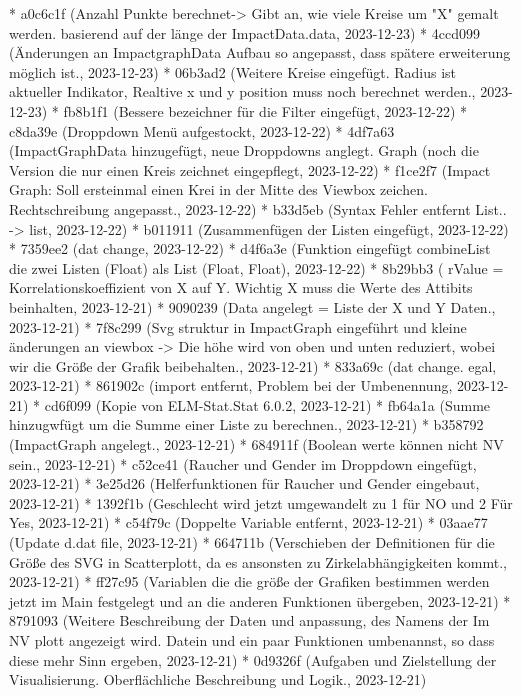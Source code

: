 \documentclass[usegeometry=true]{scrartcl}
\begin{document}
* a0c6c1f (Anzahl Punkte berechnet-> Gibt an, wie viele Kreise um "X" gemalt werden. basierend auf der länge der ImpactData.data, 2023-12-23)
* 4ccd099 (Änderungen an ImpactgraphData Aufbau so angepasst, dass spätere erweiterung möglich ist., 2023-12-23)
* 06b3ad2 (Weitere Kreise eingefügt. Radius ist aktueller Indikator, Realtive x und y position muss noch berechnet werden., 2023-12-23)
* fb8b1f1 (Bessere bezeichner für die Filter eingefügt, 2023-12-22)
* c8da39e (Droppdown Menü aufgestockt, 2023-12-22)
* 4df7a63 (ImpactGraphData hinzugefügt, neue Droppdowns anglegt. Graph (noch die Version die nur einen Kreis zeichnet eingepflegt, 2023-12-22)
* f1ce2f7 (Impact Graph: Soll ersteinmal einen Krei in der Mitte des Viewbox zeichen. Rechtschreibung angepasst., 2023-12-22)
* b33d5eb (Syntax Fehler entfernt List.. -> list, 2023-12-22)
* b011911 (Zusammenfügen der Listen eingefügt, 2023-12-22)
* 7359ee2 (dat change, 2023-12-22)
* d4f6a3e (Funktion eingefügt combineList die zwei Listen (Float) als List (Float, Float), 2023-12-22)
* 8b29bb3 ( rValue = Korrelationskoeffizient von X auf Y. Wichtig X muss die Werte des Attibits beinhalten, 2023-12-21)
* 9090239 (Data angelegt = Liste der X und Y Daten., 2023-12-21)
* 7f8c299 (Svg struktur in ImpactGraph eingeführt und kleine änderungen an viewbox -> Die höhe wird von oben und unten reduziert, wobei wir die Größe der Grafik beibehalten., 2023-12-21)
* 833a69c (dat change. egal, 2023-12-21)
* 861902c (import entfernt, Problem bei der Umbenennung, 2023-12-21)
* cd6f099 (Kopie von ELM-Stat.Stat 6.0.2, 2023-12-21)
* fb64a1a (Summe hinzugwfügt um die Summe einer Liste zu berechnen., 2023-12-21)
* b358792 (ImpactGraph angelegt., 2023-12-21)
* 684911f (Boolean werte können nicht NV sein., 2023-12-21)
* c52ce41 (Raucher und Gender im Droppdown eingefügt, 2023-12-21)
* 3e25d26 (Helferfunktionen für Raucher und Gender eingebaut, 2023-12-21)
* 1392f1b (Geschlecht wird jetzt umgewandelt zu 1 für NO und 2 Für Yes, 2023-12-21)
* c54f79c (Doppelte Variable entfernt, 2023-12-21)
* 03aae77 (Update d.dat file, 2023-12-21)
* 664711b (Verschieben der Definitionen für die Größe des SVG in Scatterplott, da es ansonsten zu Zirkelabhängigkeiten kommt., 2023-12-21)
* ff27c95 (Variablen die die größe der Grafiken bestimmen werden jetzt im Main festgelegt und an die anderen Funktionen übergeben, 2023-12-21)
* 8791093 (Weitere Beschreibung der Daten und anpassung, des Namens der Im NV plott angezeigt wird. Datein und ein paar Funktionen umbenannst, so dass diese mehr Sinn ergeben, 2023-12-21)
* 0d9326f (Aufgaben und Zielstellung der Visualisierung.  Oberflächliche Beschreibung und Logik., 2023-12-21)
\end{document}
